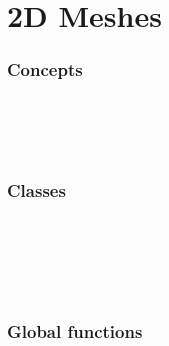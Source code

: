 \newcommand{\meshcdtrequires}[0]{must be instantiated 
by a constrained Delaunay triangulation class.  Such a class can be 
either a plain constrained Delaunay triangulation 
(\ccc{Constrained_Delaunay_triangulation_2<Gt, Tds>}) or a derived 
class such as \ccc{Constrained_triangulation_plus_2<CDT2>} or 
\ccc{Triangulation_hierarchy_2<CDT2>} where \ccc{CDT2} is 
\ccc{Constrained_Delaunay_triangulation_2<Gt, Tds>}.}

\chapter{2D Meshes}


\subsection*{Concepts}
\\
\\
\\
%

\subsection*{Classes}
\\
\\
\\
\\
%

\subsection*{Global functions}
\\
\\
%


